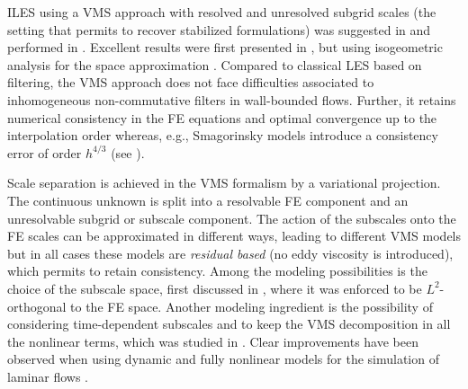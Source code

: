 ILES using a VMS approach with resolved and unresolved subgrid scales (the setting that permits to recover stabilized formulations) was suggested in \cite{codina_stabilized_2002} and performed in \cite{Calo_2004,bazilevs_variational_2007,nogueira_implicit_2010}. Excellent results were first presented in \cite{bazilevs_variational_2007}, but using isogeometric analysis for the space approximation \cite{Hughes_2005a}. Compared to classical LES based on filtering, the VMS approach does not face difficulties associated to inhomogeneous non-commutative filters in wall-bounded flows. Further, it retains numerical consistency in the FE equations and optimal convergence up to the interpolation order whereas, e.g., Smagorinsky models introduce a consistency error of order $h^{4/3}$ (see \cite{hughes_large_2000,hughes_large_2001,bazilevs_variational_2007}).

Scale separation is achieved in the VMS formalism by a variational projection. The continuous unknown is split into a resolvable FE component and an unresolvable subgrid or subscale component. The action of the subscales onto the FE scales can be approximated in different ways, leading to different VMS models but in all cases these models are {\em residual based} (no eddy viscosity is introduced), which permits to retain consistency. Among the modeling possibilities is the choice of the subscale space, first discussed in \cite{codina_stabilization_2000}, where it was enforced to be $L^2$-orthogonal to the FE space. Another modeling ingredient is the possibility of considering time-dependent subscales and to keep the VMS decomposition in all the nonlinear terms, which was studied in \cite{codina_stabilized_2002,codina_time_2007}. Clear improvements have been observed when using dynamic and fully nonlinear models for the simulation of laminar flows \cite{codina_time_2007, Avila2011}.


